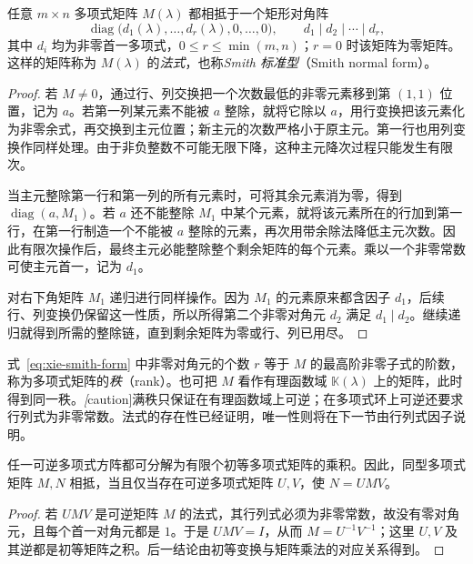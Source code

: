 \begin{theorem}
\label{thm:xie-smith-existence}
任意 $m\times n$ 多项式矩阵 $M(\lambda)$ 都相抵于一个矩形对角阵
\begin{equation}
\label{eq:xie-smith-form}
    \operatorname{diag}\bigl(d_1(\lambda),\ldots,d_r(\lambda),0,\ldots,0\bigr),
    \qquad d_1\mid d_2\mid\cdots\mid d_r,
\end{equation}
其中 $d_i$ 均为非零首一多项式，$0\le r\le\min(m,n)$；$r=0$ 时该矩阵为零矩阵。这样的矩阵称为 $M(\lambda)$ 的\emph{法式}，也称\emph{Smith 标准型}（Smith normal form）。
\end{theorem}
\begin{proof}
若 $M\ne0$，通过行、列交换把一个次数最低的非零元素移到第 $(1,1)$ 位置，记为 $a$。若第一列某元素不能被 $a$ 整除，就将它除以 $a$，用行变换把该元素化为非零余式，再交换到主元位置；新主元的次数严格小于原主元。第一行也用列变换作同样处理。由于非负整数不可能无限下降，这种主元降次过程只能发生有限次。

当主元整除第一行和第一列的所有元素时，可将其余元素消为零，得到 $\operatorname{diag}(a,M_1)$。若 $a$ 还不能整除 $M_1$ 中某个元素，就将该元素所在的行加到第一行，在第一行制造一个不能被 $a$ 整除的元素，再次用带余除法降低主元次数。因此有限次操作后，最终主元必能整除整个剩余矩阵的每个元素。乘以一个非零常数可使主元首一，记为 $d_1$。

对右下角矩阵 $M_1$ 递归进行同样操作。因为 $M_1$ 的元素原来都含因子 $d_1$，后续行、列变换仍保留这一性质，所以所得第二个非零对角元 $d_2$ 满足 $d_1\mid d_2$。继续递归就得到所需的整除链，直到剩余矩阵为零或行、列已用尽。
\end{proof}

式~\eqref{eq:xie-smith-form} 中非零对角元的个数 $r$ 等于 $M$ 的最高阶非零子式的阶数，称为多项式矩阵的\emph{秩}（rank）。也可把 $M$ 看作有理函数域 $\mathbb K(\lambda)$ 上的矩阵，此时得到同一秩。\emph[caution]{满秩只保证在有理函数域上可逆；在多项式环上可逆还要求行列式为非零常数。}法式的存在性已经证明，唯一性则将在下一节由行列式因子说明。

\begin{corollary}
\label{cor:xie-unimodular-elementary}
任一可逆多项式方阵都可分解为有限个初等多项式矩阵的乘积。因此，同型多项式矩阵 $M,N$ 相抵，当且仅当存在可逆多项式矩阵 $U,V$，使 $N=UMV$。
\end{corollary}
\begin{proof}
若 $UMV$ 是可逆矩阵 $M$ 的法式，其行列式必须为非零常数，故没有零对角元，且每个首一对角元都是 $1$。于是 $UMV=I$，从而 $M=U^{-1}V^{-1}$；这里 $U,V$ 及其逆都是初等矩阵之积。后一结论由初等变换与矩阵乘法的对应关系得到。
\end{proof}

